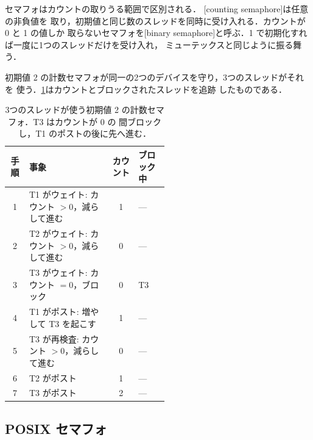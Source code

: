 \documentclass[../main.tex]{subfiles}
\begin{document}
セマフォはカウントの取りうる範囲で区別される．
[counting semaphore]は任意の非負値を
取り，初期値と同じ数のスレッドを同時に受け入れる．カウントが 0 と 1 の値しか
取らないセマフォを[binary
semaphore]と呼ぶ．1 で初期化すれば一度に1つのスレッドだけを受け入れ，
ミューテックスと同じように振る舞う．

\begin{example}
  初期値 2 の計数セマフォが同一の2つのデバイスを守り，3つのスレッドがそれを
  使う．\cref{tab:l10-sem-trace}はカウントとブロックされたスレッドを追跡
  したものである．
\end{example}

\begin{table}[htbp]
  \centering
  \caption{3つのスレッドが使う初期値 2 の計数セマフォ．T3 はカウントが 0 の
    間ブロックし，T1 のポストの後に先へ進む．}
  \label{tab:l10-sem-trace}
  \small
  \begin{tabular}{@{}c>{\raggedright\arraybackslash}p{0.52\linewidth}cl@{}}
    \toprule
    手順 & 事象 & カウント & ブロック中 \\
    \midrule
    1 & T1 がウェイト: カウント $>0$，減らして進む & 1 & --- \\
    2 & T2 がウェイト: カウント $>0$，減らして進む & 0 & --- \\
    3 & T3 がウェイト: カウント $=0$，ブロック     & 0 & T3 \\
    4 & T1 がポスト: 増やして T3 を起こす          & 1 & --- \\
    5 & T3 が再検査: カウント $>0$，減らして進む   & 0 & --- \\
    6 & T2 がポスト                                & 1 & --- \\
    7 & T3 がポスト                                & 2 & --- \\
    \bottomrule
  \end{tabular}
\end{table}

\subsection{POSIX セマフォ}
\end{document}
